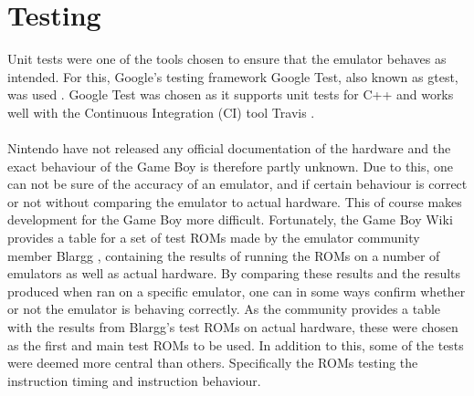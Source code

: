 \section{Testing}
Unit tests were one of the tools chosen to ensure that the emulator behaves as intended. For this, Google's testing framework Google Test, also known as gtest, was used \cite{gtest}. Google Test was chosen as it supports unit tests for C++ and works well with the Continuous Integration (CI) tool Travis \cite{Travis}.
\\\\
Nintendo have not released any official documentation of the hardware and the exact behaviour of the Game Boy is therefore partly unknown. Due to this, one can not be sure of the accuracy of an emulator, and if certain behaviour is correct or not without comparing the emulator to actual hardware. This of course makes development for the Game Boy more difficult. Fortunately, the Game Boy Wiki provides a table for a set of test ROMs \cite{TestROMsResult} made by the emulator community member Blargg \cite{Blargg}, containing the results of running the ROMs on a number of emulators as well as actual hardware. By comparing these results and the results produced when ran on a specific emulator, one can in some ways confirm whether or not the emulator is behaving correctly. As the community provides a table with the results from Blargg's test ROMs on actual hardware, these were chosen as the first and main test ROMs to be used. In addition to this, some of the tests were deemed more central than others. Specifically the ROMs testing the instruction timing and instruction behaviour.
